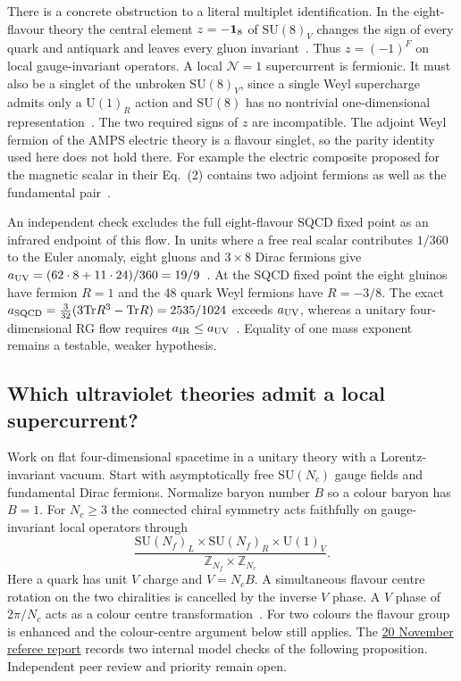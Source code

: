 \documentclass[11pt,a4paper]{article}
\theoremstyle{plain}
\theoremstyle{definition}
\theoremstyle{remark}
\newcommand{\Nc}{N_{\!c}}
\newcommand{\Nf}{N_{\!f}}
\newcommand{\SU}[1]{\mathrm{SU}(#1)}
\newcommand{\UU}[1]{\mathrm{U}(#1)}
\newcommand{\Tr}{\mathrm{Tr}}
\begin{document}
There is a concrete obstruction to a literal multiplet identification.
In the eight-flavour theory the central element $z=-{\bf 1}_8$ of
$\SU{8}_V$ changes the sign of every quark and antiquark and leaves
every gluon invariant~\cite{Tanizaki2018}.  Thus $z=(-1)^F$ on local
gauge-invariant operators.  A local $\mathcal N=1$ supercurrent is
fermionic.  It must also be a singlet of the unbroken $\SU{8}_V$,
since a single Weyl supercharge admits only a $\UU{1}_R$ action and
$\SU{8}$ has no nontrivial one-dimensional representation~\cite{IntriligatorWecht}.
The two required signs of $z$ are incompatible.  The adjoint Weyl
fermion of the AMPS electric theory is a flavour singlet, so the
parity identity used here does not hold there.  For example the electric
composite proposed for the magnetic scalar in their Eq.~(2) contains
two adjoint fermions as well as the fundamental pair~\cite{AMPS2013}.

An independent check excludes the full eight-flavour SQCD fixed point
as an infrared endpoint of this flow.  In units where a free real
scalar contributes $1/360$ to the Euler anomaly, eight gluons and
$3\times8$ Dirac fermions give $a_{\rm UV}=(62\cdot8+11\cdot24)/360
=19/9$~\cite{Karasik2022}.  At the SQCD fixed point the eight gluinos have fermion
$R=1$ and the 48 quark Weyl fermions have $R=-3/8$.  The exact
$a_{\rm SQCD}=\tfrac{3}{32}(3\Tr R^3-\Tr R)=2535/1024$ exceeds
$a_{\rm UV}$, whereas a unitary four-dimensional RG flow requires
$a_{\rm IR}\leq a_{\rm UV}$~\cite{Anselmi1998,Komargodski2011}.
Equality of one mass exponent remains a testable, weaker hypothesis.

\subsection{Which ultraviolet theories admit a local supercurrent?}
\label{ssec:endpoint-map}

Work on flat four-dimensional spacetime in a unitary theory with a
Lorentz-invariant vacuum. Start with asymptotically free $\SU{\Nc}$
gauge fields and fundamental Dirac fermions. Normalize baryon number
$B$ so a colour baryon has $B=1$.
For $\Nc\geq3$ the connected chiral symmetry acts faithfully on
gauge-invariant local operators through
\begin{equation}
 \frac{\SU{\Nf}_L\times\SU{\Nf}_R\times\UU{1}_V}
      {\mathbb Z_{\Nf}\times\mathbb Z_{\Nc}} .
\end{equation}
Here a quark has unit $V$ charge and $V=\Nc B$. A simultaneous
flavour centre rotation on the two chiralities is cancelled by the
inverse $V$ phase. A $V$ phase of $2\pi/\Nc$ acts as a colour
centre transformation~\cite{Tanizaki2018}. For two colours the flavour
group is enhanced and the colour-centre argument below still applies.
The \href{https://github.com/arivero/dualsm/blob/master/assessment/2026-11-20/joint-referee-report.md}{20 November referee report}
records two internal model checks of the following proposition.
Independent peer review and priority remain open.
\end{document}
